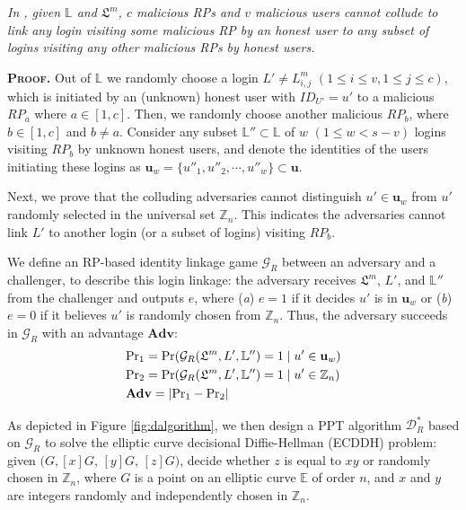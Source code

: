 \begin{thm}[RP Unlinkability]
\emph{In \usso, given $\mathbb{L}$ and $\mathfrak{L}^m$, $c$ malicious RPs and $v$ malicious users cannot collude to link any login visiting some malicious RP by an honest user to any subset of logins visiting any other malicious RPs by honest users.}
\label{thm-rp-unlinkability}
\end{thm}

\noindent\textbf{\textsc{Proof.}} Out of $\mathbb{L}$
 we randomly choose a login $L' \neq L^m_{i,j}$ $(1 \le i \le v, 1 \le j \le c)$,
 which is initiated by an (unknown) honest user with $ID_{U'}=u'$ to a malicious $RP_{a}$ where $a \in [1,c]$.
Then, we randomly choose another malicious $RP_{b}$, where $b \in [1,c]$ and $b \neq a$.
Consider any subset $\mathbb{L}'' \subset \mathbb{L}$ of $w$ $(1 \leq w < s-v)$ logins visiting $RP_{b}$ by unknown honest users,
 and denote the identities of the users initiating these logins as $\mathbf{u}_w=\{{u''_1}, {u''_2}, \cdots, {u''_w}\} \subset \mathbf{u}$.

Next, we prove that the colluding adversaries cannot distinguish $u' \in \mathbf{u}_w$ from $u'$ randomly selected in the universal set $\mathbb{Z}_n$.
This indicates the adversaries cannot link $L'$ to another login (or a subset of logins) visiting $RP_{b}$.


We define an RP-based identity linkage game $\mathcal{G}_R$ between an adversary and a challenger, to describe this login linkage: the adversary receives $\mathfrak{L}^m$, $L'$, and $\mathbb{L}''$ from the challenger and outputs $e$, where (\emph{a}) $e = 1$ if it decides $u'$ is in $\mathbf{u}_w$ %
or (\emph{b}) $e=0$ if it believes $u'$ is randomly chosen from $\mathbb{Z}_n$.
Thus, the adversary succeeds in $\mathcal{G}_R$ with an advantage $\mathbf{Adv}$:
\begin{align*}
&{\rm Pr}_1={\rm Pr}(\mathcal{G}_R(\mathfrak{L}^m, L', \mathbb{L}'')=1 \;| \; u' \in \mathbf{u}_w)  \\
&{\rm Pr}_2={\rm Pr}(\mathcal{G}_R(\mathfrak{L}^m, L', \mathbb{L}'')=1 \; | \; u' \in \mathbb{Z}_n)\\
&{\mathbf{Adv}}=|{\rm Pr}_1-{\rm Pr}_2|
\end{align*}

As depicted in Figure \ref{fig:dalgorithm}, we then design a PPT algorithm $\mathcal{D}^*_R$ based on $\mathcal{G}_R$ to solve the elliptic curve decisional Diffie-Hellman (ECDDH) problem: given $(G, [x]G$, $[y]G$, $[z]G)$, decide whether $z$ is equal to $xy$ or randomly chosen in $\mathbb{Z}_n$, where $G$ is a point on an elliptic curve $\mathbb{E}$ of order $n$, and $x$ and $y$ are integers randomly and independently chosen in $\mathbb{Z}_n$.


